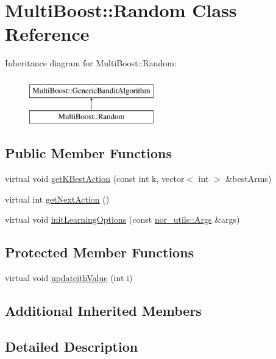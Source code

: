 \hypertarget{classMultiBoost_1_1Random}{\section{Multi\-Boost\-:\-:Random Class Reference}
\label{classMultiBoost_1_1Random}
}
Inheritance diagram for Multi\-Boost\-:\-:Random\-:\begin{figure}[H]
\begin{center}
\leavevmode
\includegraphics[height=2.000000cm]{classMultiBoost_1_1Random}
\end{center}
\end{figure}
\subsection*{Public Member Functions}
\begin{DoxyCompactItemize}
\item 
virtual void \hyperlink{classMultiBoost_1_1Random_a011b2cf748994c866148f1979c0b59b1}{get\-K\-Best\-Action} (const int k, vector$<$ int $>$ \&best\-Arms)
\item 
virtual int \hyperlink{classMultiBoost_1_1Random_ae38f8c4de358e6261e02ab1a83475128}{get\-Next\-Action} ()
\item 
virtual void \hyperlink{classMultiBoost_1_1Random_a8b8cd993571fb86c394e8de747649b60}{init\-Learning\-Options} (const \hyperlink{classnor__utils_1_1Args}{nor\-\_\-utils\-::\-Args} \&args)
\end{DoxyCompactItemize}
\subsection*{Protected Member Functions}
\begin{DoxyCompactItemize}
\item 
virtual void \hyperlink{classMultiBoost_1_1Random_a8dbf16884f29168fa9cb3feede07bd4e}{updateith\-Value} (int i)
\end{DoxyCompactItemize}
\subsection*{Additional Inherited Members}


\subsection{Detailed Description}


